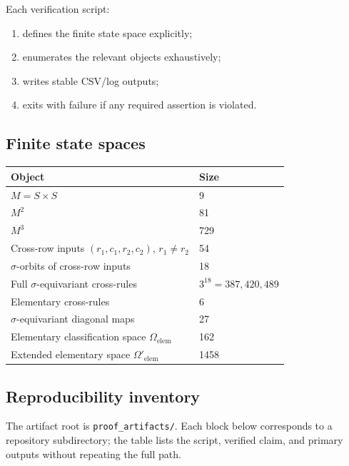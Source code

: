 \documentclass[11pt]{article}
\begin{document}
Each verification script:
\begin{enumerate}[leftmargin=2.2em,itemsep=0.25em]
\item defines the finite state space explicitly;
\item enumerates the relevant objects exhaustively;
\item writes stable CSV/log outputs;
\item exits with failure if any required assertion is violated.
\end{enumerate}

\subsection{Finite state spaces}

\begin{center}
\small
\begin{tabular}{@{}ll@{}}
\toprule
Object & Size \\
\midrule
\(M=S\times S\) & 9 \\
\(M^2\) & 81 \\
\(M^3\) & 729 \\
Cross-row inputs \((r_1,c_1,r_2,c_2)\), \(r_1\ne r_2\) & 54 \\
\(\sigma\)-orbits of cross-row inputs & 18 \\
Full \(\sigma\)-equivariant cross-rules & \(3^{18}=387{,}420{,}489\) \\
Elementary cross-rules & 6 \\
\(\sigma\)-equivariant diagonal maps & 27 \\
Elementary classification space \(\Omega_{\mathrm{elem}}\) & 162 \\
Extended elementary space \(\Omega'_{\mathrm{elem}}\) & 1458 \\
\bottomrule
\end{tabular}
\end{center}

\subsection{Reproducibility inventory}

The artifact root is \texttt{proof\_artifacts/}. Each block below corresponds to a repository subdirectory; the table lists the script, verified claim, and primary outputs without repeating the full path.
\end{document}
